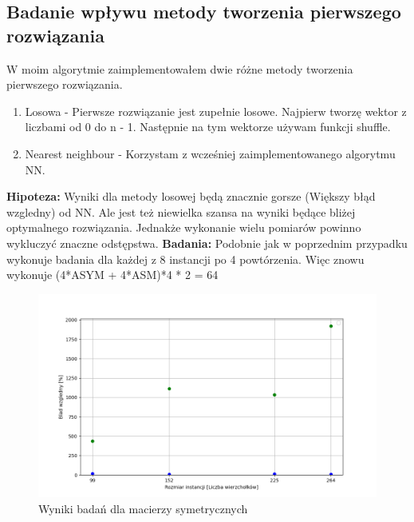 \documentclass{article}
\begin{document}
      \subsection{Badanie wpływu metody tworzenia pierwszego rozwiązania}
        W moim algorytmie zaimplementowałem dwie różne metody tworzenia pierwszego rozwiązania.
        \begin{enumerate}
          \item Losowa - Pierwsze rozwiązanie jest zupełnie losowe. Najpierw tworzę wektor z liczbami
          od 0 do n - 1. Następnie na tym wektorze używam funkcji shuffle. 
          \item Nearest neighbour - Korzystam z wcześniej zaimplementowanego algorytmu NN. 
        \end{enumerate}
        \textbf{Hipoteza: } Wyniki dla metody losowej będą znacznie gorsze (Większy błąd wzgledny) od NN.
        Ale jest też niewielka szansa na wyniki będące bliżej optymalnego rozwiązania. Jednakże wykonanie
        wielu pomiarów powinno wykluczyć znaczne odstępstwa.\linebreak
        \textbf{Badania: } Podobnie jak w poprzednim przypadku wykonuje badania dla każdej z 8 instancji
        po 4 powtórzenia. Więc znowu wykonuje (4*ASYM + 4*ASM)*4 * 2 = 64\linebreak
        
        \FloatBarrier
        \begin{figure}[ht]
          \centering
          \includegraphics[width=\textwidth]{src/plots/symTsStartVal.png}
          \caption{Wyniki badań dla macierzy symetrycznych}
          \label{fig:symStartVal}
        \end{figure}
\end{document}
